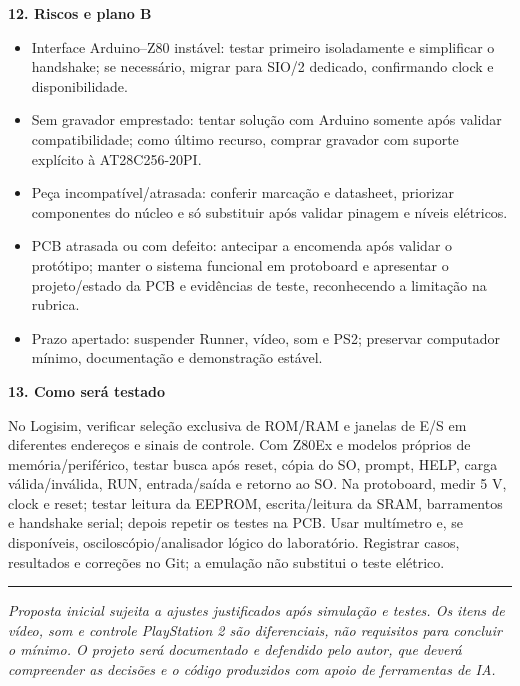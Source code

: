 \documentclass[10pt,a4paper]{article}
\newcommand{\field}[2]{\par\vspace{4pt}\noindent\textbf{#1. #2}\par\nopagebreak[4]}
\begin{document}
\field{12}{Riscos e plano B}
\begin{itemize}
\item Interface Arduino--Z80 instável: testar primeiro isoladamente e simplificar o handshake; se necessário, migrar para SIO/2 dedicado, confirmando clock e disponibilidade.
\item Sem gravador emprestado: tentar solução com Arduino somente após validar compatibilidade; como último recurso, comprar gravador com suporte explícito à AT28C256-20PI.
\item Peça incompatível/atrasada: conferir marcação e datasheet, priorizar componentes do núcleo e só substituir após validar pinagem e níveis elétricos.
\item PCB atrasada ou com defeito: antecipar a encomenda após validar o protótipo; manter o sistema funcional em protoboard e apresentar o projeto/estado da PCB e evidências de teste, reconhecendo a limitação na rubrica.
\item Prazo apertado: suspender Runner, vídeo, som e PS2; preservar computador mínimo, documentação e demonstração estável.
\end{itemize}

\field{13}{Como será testado} No Logisim, verificar seleção exclusiva de ROM/RAM e janelas de E/S em diferentes endereços e sinais de controle. Com Z80Ex e modelos próprios de memória/periférico, testar busca após reset, cópia do SO, prompt, HELP, carga válida/inválida, RUN, entrada/saída e retorno ao SO. Na protoboard, medir 5 V, clock e reset; testar leitura da EEPROM, escrita/leitura da SRAM, barramentos e handshake serial; depois repetir os testes na PCB. Usar multímetro e, se disponíveis, osciloscópio/analisador lógico do laboratório. Registrar casos, resultados e correções no Git; a emulação não substitui o teste elétrico.

\vspace{3pt}\hrule\vspace{3pt}
\footnotesize\textit{Proposta inicial sujeita a ajustes justificados após simulação e testes. Os itens de vídeo, som e controle PlayStation 2 são diferenciais, não requisitos para concluir o mínimo. O projeto será documentado e defendido pelo autor, que deverá compreender as decisões e o código produzidos com apoio de ferramentas de IA.}
\end{document}
